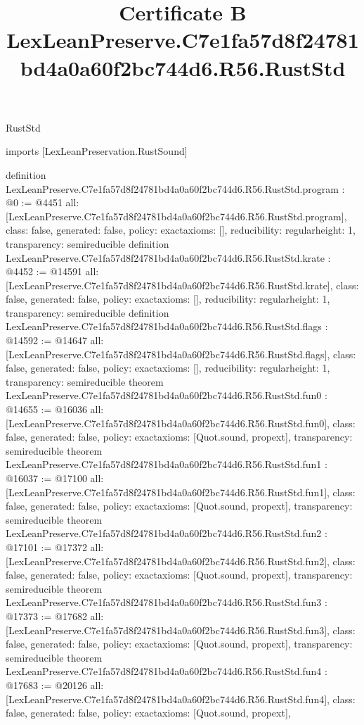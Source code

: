 \begin{lexlean}{RustStd}
\title{Certificate B LexLeanPreserve.C7e1fa57d8f24781bd4a0a60f2bc744d6.R56.RustStd}
\begin{coremodule}
imports [LexLeanPreservation.RustSound]

definition LexLeanPreserve.C7e1fa57d8f24781bd4a0a60f2bc744d6.R56.RustStd.program : @0 := @4451 {
  all: [LexLeanPreserve.C7e1fa57d8f24781bd4a0a60f2bc744d6.R56.RustStd.program],
  class: false,
  generated: false,
  policy: exact{axioms: []},
  reducibility: regular{height: 1},
  transparency: semireducible
}
definition LexLeanPreserve.C7e1fa57d8f24781bd4a0a60f2bc744d6.R56.RustStd.krate : @4452 := @14591 {
  all: [LexLeanPreserve.C7e1fa57d8f24781bd4a0a60f2bc744d6.R56.RustStd.krate],
  class: false,
  generated: false,
  policy: exact{axioms: []},
  reducibility: regular{height: 1},
  transparency: semireducible
}
definition LexLeanPreserve.C7e1fa57d8f24781bd4a0a60f2bc744d6.R56.RustStd.flags : @14592 := @14647 {
  all: [LexLeanPreserve.C7e1fa57d8f24781bd4a0a60f2bc744d6.R56.RustStd.flags],
  class: false,
  generated: false,
  policy: exact{axioms: []},
  reducibility: regular{height: 1},
  transparency: semireducible
}
theorem LexLeanPreserve.C7e1fa57d8f24781bd4a0a60f2bc744d6.R56.RustStd.fun0 : @14655 := @16036 {
  all: [LexLeanPreserve.C7e1fa57d8f24781bd4a0a60f2bc744d6.R56.RustStd.fun0],
  class: false,
  generated: false,
  policy: exact{axioms: [Quot.sound, propext]},
  transparency: semireducible
}
theorem LexLeanPreserve.C7e1fa57d8f24781bd4a0a60f2bc744d6.R56.RustStd.fun1 : @16037 := @17100 {
  all: [LexLeanPreserve.C7e1fa57d8f24781bd4a0a60f2bc744d6.R56.RustStd.fun1],
  class: false,
  generated: false,
  policy: exact{axioms: [Quot.sound, propext]},
  transparency: semireducible
}
theorem LexLeanPreserve.C7e1fa57d8f24781bd4a0a60f2bc744d6.R56.RustStd.fun2 : @17101 := @17372 {
  all: [LexLeanPreserve.C7e1fa57d8f24781bd4a0a60f2bc744d6.R56.RustStd.fun2],
  class: false,
  generated: false,
  policy: exact{axioms: [Quot.sound, propext]},
  transparency: semireducible
}
theorem LexLeanPreserve.C7e1fa57d8f24781bd4a0a60f2bc744d6.R56.RustStd.fun3 : @17373 := @17682 {
  all: [LexLeanPreserve.C7e1fa57d8f24781bd4a0a60f2bc744d6.R56.RustStd.fun3],
  class: false,
  generated: false,
  policy: exact{axioms: [Quot.sound, propext]},
  transparency: semireducible
}
theorem LexLeanPreserve.C7e1fa57d8f24781bd4a0a60f2bc744d6.R56.RustStd.fun4 : @17683 := @20126 {
  all: [LexLeanPreserve.C7e1fa57d8f24781bd4a0a60f2bc744d6.R56.RustStd.fun4],
  class: false,
  generated: false,
  policy: exact{axioms: [Quot.sound, propext]},
}
\end{coremodule}
\end{lexlean}
